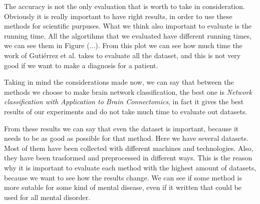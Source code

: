 The accuracy is not the only evaluation that is worth to take in consideration. Obviously it is really important to have right results, in order to use these methods for scientific purpuses. What we think also important to evaluate is the running time. All the algortihms that we evaluated have different running times, we can see them in Figure (...). From this plot we can see how much time the work of Guti\'{e}rrez et al. \cite{GutierrezBio} takes to evaluate all the dataset, and this is not very good if we want to make a diagnosis for a patient. 
\vspace{0.5cm}

Taking in mind the considerations made now, we can say that between the methods we choose to make brain network classification, the best one is \textit{Network classification with Application to Brain Connectomics}, in fact it gives the best results of our experiments and do not take much time to evaluate out datasets.

From these results we can say that even the dataset is important, because it needs to be as good as possible for that method. Here we have several datasets. Most of them have been collected with different machines and technologies. Also, they have been trasformed and preprocessed in different ways. This is the reason why it is important to evaluate each method with the highest amount of datasets, because we want to see how the results change. We can see if some method is more sutable for some kind of mental disease, even if it written that could be used for all mental disorder.
